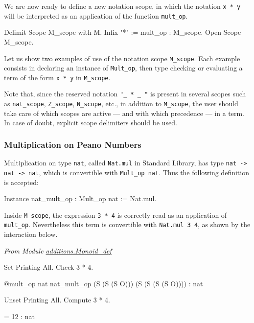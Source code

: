 We are now ready to define a new notation scope, in which the notation
\texttt{x * y} will be interpreted as an application of the function
\texttt{mult\_op}.

\begin{Coqsrc}
Delimit Scope M_scope with M.
Infix "*" := mult_op : M_scope.
Open Scope M_scope.  
\end{Coqsrc}

 Let us show two examples of use of the
notation scope \texttt{M\_scope}. Each example consists in declaring an 
instance of \texttt{Mult\_op}, then type checking or evaluating
a term of the form \texttt{x * y} in \texttt{M\_scope}.

Note that, since the reserved notation \texttt{"\_ * \_ "} is 
present in several scopes such as  \texttt{nat\_scope}, \texttt{Z\_scope},
\texttt{N\_scope}, etc., in addition to  \texttt{M\_scope},  the user should
take care of which scopes are active --- and with  which precedence --- in a \gallina{} term.
In case of doubt, explicit scope delimiters should be used.
  




\subsubsection{Multiplication on Peano Numbers}

Multiplication  on type \texttt{nat}, called \texttt{Nat.mul} in
Standard Library, has  type \linebreak \texttt{nat -> nat -> nat}, which is
convertible  with \texttt{Mult\_op nat}. Thus the following definition is
accepted:

\begin{Coqsrc}
Instance nat_mult_op : Mult_op nat  := Nat.mul.
\end{Coqsrc}

Inside \texttt{M\_scope}, the expression \texttt{3 * 4} is 
correctly read as an application of \texttt{mult\_op}. Nevertheless 
this term is convertible with \texttt{Nat.mul 3 4}, as shown by the 
interaction below.

\emph{From Module \href{../theories/html/hydras.additions.Monoid_def.html}{additions.Monoid\_def}}

\begin{Coqsrc}
Set Printing All.
Check  3 * 4. 
\end{Coqsrc}
\begin{Coqanswer}
@mult_op nat nat_mult_op (S (S (S O))) (S (S (S (S O))))
     : nat  
\end{Coqanswer}
\begin{Coqsrc}
Unset Printing All.
Compute 3 * 4.   
\end{Coqsrc}
\begin{Coqanswer}
 = 12  : nat  
\end{Coqanswer}


